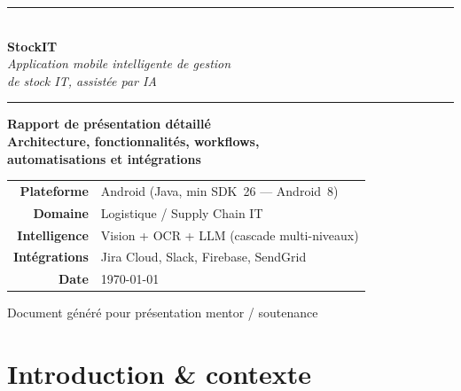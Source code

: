 \documentclass[11pt,a4paper]{article}
\begin{document}
\thispagestyle{empty}
\begin{center}
\vspace*{1.5cm}
{\color{primary}\rule{\linewidth}{1.2pt}}\\[6pt]
{\Huge\bfseries\color{primary} StockIT}\\[6pt]
{\Large\itshape Application mobile intelligente de gestion\\
de stock IT, assistée par IA}\\[4pt]
{\color{primary}\rule{\linewidth}{1.2pt}}

\vspace{2.5cm}

\begin{tcolorbox}[colback=soft, colframe=primary,
  boxrule=0.5pt, arc=5pt, width=0.85\linewidth, halign=center]
\Large\bfseries Rapport de présentation détaillé\\[4pt]
\normalsize\normalfont
Architecture, fonctionnalités, workflows,\\
automatisations et intégrations
\end{tcolorbox}

\vspace{3cm}

\begin{tabular}{rl}
\textbf{Plateforme}      & Android (Java, min SDK~26 — Android~8)\\[3pt]
\textbf{Domaine}         & Logistique / Supply Chain IT\\[3pt]
\textbf{Intelligence}    & Vision + OCR + LLM (cascade multi-niveaux)\\[3pt]
\textbf{Intégrations}    & Jira Cloud, Slack, Firebase, SendGrid\\[3pt]
\textbf{Date}            & \today
\end{tabular}

\vfill
{\color{primary!70}\small Document généré pour présentation mentor / soutenance}
\end{center}

\newpage

\tableofcontents
\newpage

\section{Introduction \& contexte}
\end{document}
